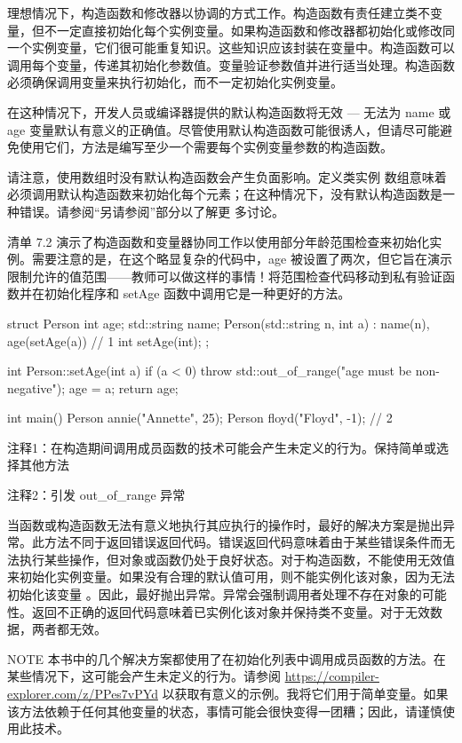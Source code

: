 
理想情况下，构造函数和修改器以协调的方式工作。构造函数有责任建立类不变量，但不一定直接初始化每个实例变量。如果构造函数和修改器都初始化或修改同一个实例变量，它们很可能重复知识。这些知识应该封装在变量中。构造函数可以调用每个变量，传递其初始化参数值。变量验证参数值并进行适当处理。构造函数必须确保调用变量来执行初始化，而不一定初始化实例变量。

在这种情况下，开发人员或编译器提供的默认构造函数将无效 — 无法为 name 或 age 变量默认有意义的正确值。尽管使用默认构造函数可能很诱人，但请尽可能避免使用它们，方法是编写至少一个需要每个实例变量参数的构造函数。

请注意，使用数组时没有默认构造函数会产生负面影响。定义类实例 数组意味着必须调用默认构造函数来初始化每个元素；在这种情况下，没有默认构造函数是一种错误。请参阅“另请参阅”部分以了解更 多讨论。

清单 7.2 演示了构造函数和变量器协同工作以使用部分年龄范围检查来初始化实例。需要注意的是，在这个略显复杂的代码中，age 被设置了两次，但它旨在演示限制允许的值范围——教师可以做这样的事情！将范围检查代码移动到私有验证函数并在初始化程序和 setAge 函数中调用它是一种更好的方法。


\begin{cpp}
struct Person {
  int age;
  std::string name;
  Person(std::string n, int a) : name(n),
    age(setAge(a)) {} // 1
  int setAge(int);
};

int Person::setAge(int a) {
  if (a < 0)
    throw std::out_of_range("age must be non-negative");
  age = a;
  return age;
}

int main() {
  Person annie("Annette", 25);
  Person floyd("Floyd", -1); // 2
}
\end{cpp}

{\footnotesize
注释1：在构造期间调用成员函数的技术可能会产生未定义的行为。保持简单或选择其他方法

注释2：引发 out\_of\_range 异常
}

当函数或构造函数无法有意义地执行其应执行的操作时，最好的解决方案是抛出异常。此方法不同于返回错误返回代码。错误返回代码意味着由于某些错误条件而无法执行某些操作，但对象或函数仍处于良好状态。对于构造函数，不能使用无效值来初始化实例变量。如果没有合理的默认值可用，则不能实例化该对象，因为无法初始化该变量 。因此，最好抛出异常。异常会强制调用者处理不存在对象的可能性。返回不正确的返回代码意味着已实例化该对象并保持类不变量。对于无效数据，两者都无效。

\begin{myNotic}{NOTE}
本书中的几个解决方案都使用了在初始化列表中调用成员函数的方法。在某些情况下，这可能会产生未定义的行为。请参阅 \url{https://compiler-explorer.com/z/PPes7vPYd} 以获取有意义的示例。我将它们用于简单变量。如果该方法依赖于任何其他变量的状态，事情可能会很快变得一团糟；因此，请谨慎使用此技术。
\end{myNotic}

